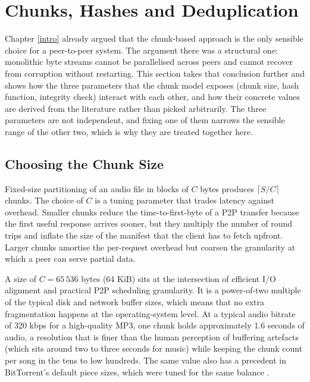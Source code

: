 \section{Chunks, Hashes and Deduplication}
\label{sec:chunk-theory}

\indent \par Chapter \ref{intro} already argued that the chunk-based approach is the only sensible choice for a peer-to-peer system. The argument there was a structural one: monolithic byte streams cannot be parallelised across peers and cannot recover from corruption without restarting. This section takes that conclusion further and shows how the three parameters that the chunk model exposes (chunk size, hash function, integrity check) interact with each other, and how their concrete values are derived from the literature rather than picked arbitrarily. The three parameters are not independent, and fixing one of them narrows the sensible range of the other two, which is why they are treated together here.

\subsection{Choosing the Chunk Size}
\label{subsec:fixed-chunks}

\indent \par Fixed-size partitioning of an audio file in blocks of $C$ bytes produces $\lceil S / C \rceil$ chunks. The choice of $C$ is a tuning parameter that trades latency against overhead. Smaller chunks reduce the time-to-first-byte of a P2P transfer because the first useful response arrives sooner, but they multiply the number of round trips and inflate the size of the manifest that the client has to fetch upfront. Larger chunks amortise the per-request overhead but coarsen the granularity at which a peer can serve partial data.

\par A size of $C = 65\,536$ bytes (64 KiB) sits at the intersection of efficient I/O alignment and practical P2P scheduling granularity. It is a power-of-two multiple of the typical disk and network buffer sizes, which means that no extra fragmentation happens at the operating-system level. At a typical audio bitrate of 320 kbps for a high-quality MP3, one chunk holds approximately 1.6 seconds of audio, a resolution that is finer than the human perception of buffering artefacts (which sits around two to three seconds for music) while keeping the chunk count per song in the tens to low hundreds. The same value also has a precedent in BitTorrent's default piece sizes, which were tuned for the same balance \cite{bittorent}.

